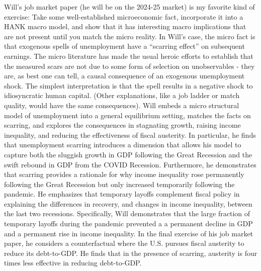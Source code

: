 \documentclass[\econtexRoot/Letter]{subfiles}
\begin{document}
\notinsubfile{\renewcommand{\econtexRoot}{.}}

\hypertarget{job-market-paper}{}
\notinsubfile{\label{sec:job-market-paper}}


Will's job market paper (he will be on the 2024-25 market) is my favorite kind of exercise: Take some well-established microeconomic fact, incorporate it into a HANK macro model, and show that it has interesting macro implications that are not present until you match the micro reality. In Will's case, the micro fact is that exogenous spells of unemployment have a ``scarring effect'' on subsequent earnings. The micro literature has made the usual heroic efforts to establish that the measured scars are not due to some form of selection on unobservables - they are, as best one can tell, a causal consequence of an exogenous unemployment shock.  The simplest interpretation is that the spell results in a negative shock to idiosyncratic human capital.  (Other explanations, like a job ladder or match quality, would have the same consequences). Will embeds a micro structural model of unemployment into a general equilibrium setting, matches the facts on scarring, and explores the consequences in stagnating growth, raising income inequality, and reducing the effectiveness of fiscal austerity. In particular, he finds that unemployment scarring introduces a dimension that allows his model to capture both the sluggish growth in GDP following the Great Recession and the swift rebound in GDP from the COVID Recession. Furthermore, he demonstrates that scarring provides a rationale for why income inequality rose permanently following the Great Recession but only increased temporarily following the pandemic. He emphasizes that temporary layoffs complement fiscal policy in explaining the differences in recovery, and changes in income inequality, between the last two recessions. Specifically, Will demonstrates that the large fraction of temporary layoffs during the pandemic prevented a a permanent decline in GDP and a permanent rise in income inequality. In the final exercise of his job market paper, he considers a counterfactual where the U.S. pursues fiscal austerity to reduce its debt-to-GDP. He finds that in the presence of scarring, austerity is four times less effective in reducing debt-to-GDP. 
\end{document}
